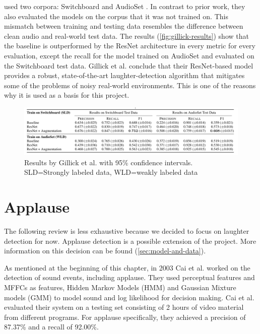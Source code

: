 \documentclass[bsc,frontabs,parskip,deptreport]{infthesis}
\begin{document}
\citet{gillick2021robust} used two corpora: Switchboard \citep{switchboard-corpus} and AudioSet \citep{googleaudioset}.
In contrast to prior work, they also evaluated the models on the corpus that it was not trained on.
This mismatch between training and testing data resembles the difference between clean audio and real-world test data.
The results (\autoref{fig:gillick-results}) show that the baseline is outperformed by the ResNet architecture in every metric for every evaluation, except the recall for the model trained on AudioSet and evaluated on the Switchboard test data. 
Gillick et al. conclude that their ResNet-based model provides a robust, state-of-the-art laughter-detection algorithm that mitigates some of the problems of noisy real-world environments. This is one of the reasons why it is used as a basis for this project.

\begin{figure}[h!]
    \centering
    \includegraphics[width=14cm]{imgs/results/gillick_et_al.png}
    \caption{Results by Gillick et al. with 95\% confidence intervals. SLD=Strongly labeled data, WLD=weakly labeled data}
    \label{fig:gillick-results}
\end{figure}

\section{Applause}
The following review is less exhaustive because we decided to focus on laughter detection for now. Applause detection is a possible extension of the project. 
More information on this decision can be found (\autoref{sec:model-and-data}).

As mentioned at the beginning of this chapter, in 2003 Cai et al. \citep{cai2003highlight} worked on the detection of sound events, including applause.
They used perceptual features and MFFCs as features, Hidden Markov Models (HMM) and Gaussian Mixture models (GMM) to model sound and log likelihood for decision making.
Cai et al. evaluated their system on a testing set consisting of 2 hours of video material from different programs.
For applause specifically, they achieved a precision of 87.37\% and a recall of 92.00\%.
\end{document}
